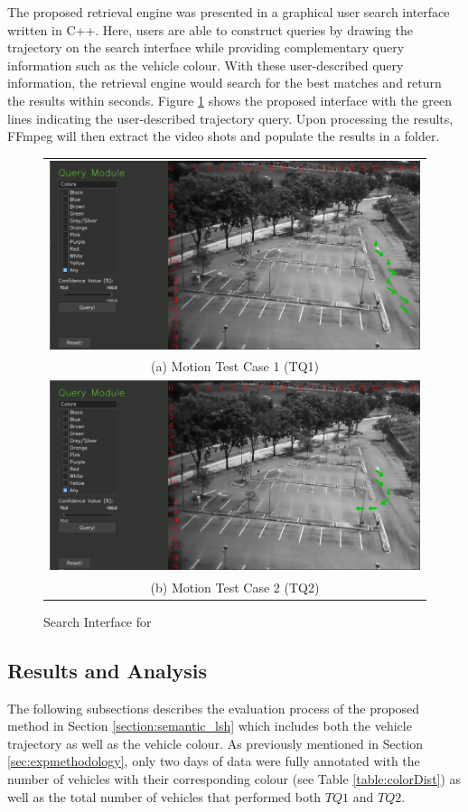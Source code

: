 The proposed retrieval engine was presented in a graphical user search interface
written in C++. Here, users are able to construct queries by drawing the
trajectory on the search interface while providing complementary query
information such as the vehicle colour. With these user-described query
information, the retrieval engine would search for the best matches and return
the results within seconds. Figure \ref{fig:versionOneInterface} shows the
proposed interface with the green lines indicating the user-described
trajectory query. Upon processing the results, FFmpeg will then extract the
video shots and populate the results in a folder.


\begin{figure}[!htb]
	\centering
	\begin{tabular}{c}
		\includegraphics[width=0.7\linewidth]{image/retrievalOne/test1-8inputs.PNG} \\
		(a) Motion Test Case 1 (TQ1) \\
		\includegraphics[width=0.7\linewidth]{image/retrievalOne/test2-6input.PNG}\\
		(b) Motion Test Case 2 (TQ2)
	\end{tabular}
	\caption{Search Interface for \versionOneRet}
	\label{fig:versionOneInterface}
\end{figure}


\subsection{Results and Analysis}
The following subsections describes the evaluation process of the proposed
method in Section \ref{section:semantic_lsh} which includes both the vehicle
trajectory as well as the vehicle colour. As previously mentioned in Section
\ref{sec:expmethodology}, only two days of data were fully annotated with the
number of vehicles with their corresponding colour (see Table
\ref{table:colorDist}) as well as the total number of vehicles that performed
both $TQ1$ and $TQ2$.

